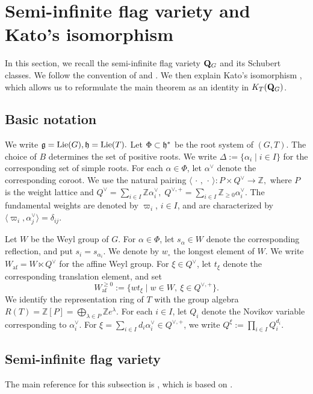 \documentclass{amsart}
\numberwithin{equation}{section}
\begin{document}
\section{Semi-infinite flag variety and Kato's isomorphism}\label{sec:semi-Kato}
In this section, we recall the semi-infinite flag variety \(\mathbf{Q}_G\) and its
Schubert classes. We follow 
the convention of \cite[\S~3]{MNS1} and
\cite[\S~2]{O}. 
We then explain Kato's isomorphism \cite{K}, which allows us to
reformulate the main theorem as an identity in \(K_T(\mathbf{Q}_G)\).


\subsection{Basic notation}

We write $
  \mathfrak{g}=\operatorname{Lie}(G),
  \mathfrak{h}=\operatorname{Lie}(T).
$
Let $\Phi\subset\mathfrak{h}^*$ be the root system of $(G,T)$.
The choice of $B$ determines the set 
of positive roots.
We write
$
  \Delta:=\{\alpha_i\mid i\in I\}
$
for the corresponding set of simple roots.
For each $\alpha\in\Phi$, let $\alpha^\lor$ denote the corresponding
coroot.  We use the natural pairing
$  \langle\,\cdot\,,\,\cdot\,\rangle
  \colon P\times Q^\lor\longrightarrow\mathbb Z,
$
where $P$ is the weight lattice and
$  Q^\lor=\sum_{i\in I}\mathbb Z\alpha_i^\lor,
  \;
  Q^{\lor,+}=\sum_{i\in I}\mathbb Z_{\geq 0}\alpha_i^\lor.
$
The fundamental weights are denoted by $\varpi_i$, $i\in I$, and are
characterized by
$ \langle\varpi_i,\alpha_j^\lor\rangle=\delta_{ij}.
$

Let $W$ be the Weyl group of $G$.  For $\alpha\in\Phi$, let
$s_\alpha\in W$ denote the corresponding reflection, and put
$s_i=s_{\alpha_i}$.  We denote by $w_\circ$ the longest element of
$W$. 
We write
$W_{\mathrm{af}}=W\ltimes Q^\lor$
for the affine Weyl group.  For $\xi\in Q^\lor$, let $t_\xi$ denote
the corresponding translation element, and set
\[
  W_{\mathrm{af}}^{\geq 0}
  :=
  \{wt_\xi\mid w\in W,\ \xi\in Q^{\lor,+}\}.
\]
We identify the representation ring of $T$ with the group algebra
$ R(T)=\mathbb Z[P]
      =\bigoplus_{\lambda\in P}\mathbb Z e^\lambda.
$
For each $i\in I$, let $Q_i$ denote the Novikov variable corresponding
to $\alpha_i^\lor$.  For
$\xi=\sum_{i\in I}d_i\alpha_i^\lor\in Q^{\lor,+}$, we write
 $ Q^\xi:=\prod_{i\in I}Q_i^{d_i}.
$
\subsection{Semi-infinite flag variety}

The main reference for this subsection is \cite[\S~3.1]{MNS1},
which is based on \cite[\S~1.4--1.5]{K}.
\end{document}
